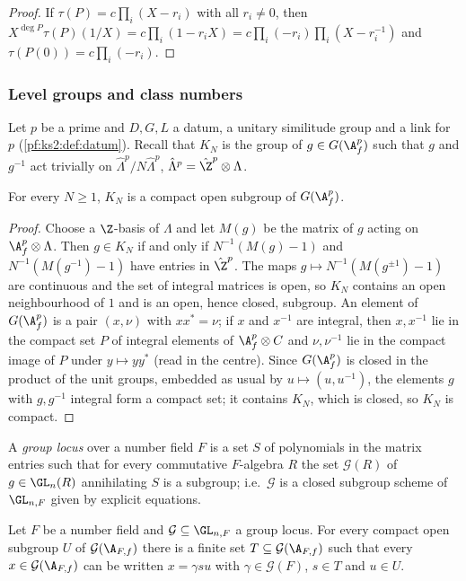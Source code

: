 \begin{proof}
If $\tau(P)=c\prod_i(X-r_i)$ with all $r_i\ne0$, then $X^{\deg P}\tau(P)(1/X)=c\prod_i(1-r_iX)=c\prod_i(-r_i)\prod_i(X-r_i^{-1})$
and $\tau(P(0))=c\prod_i(-r_i)$.
\end{proof}

\subsubsection{Level groups and class numbers}

Let $p$ be a prime and $D,G,L$ a datum, a unitary similitude group and a link for $p$
(\cref{pf:ks2:def:datum}). Recall that $K_N$ is the group of $g\in G(\A_f^p)$ such that $g$ and $g^{-1}$ act
trivially on $\hat\Lambda^p/N\hat\Lambda^p$, $\hat\Lambda^p=\hat\Z^p\otimes\Lambda$.

\begin{lemma}\label{pf:geo:kn}
For every $N\ge1$, $K_N$ is a compact open subgroup of $G(\A_f^p)$.
\end{lemma}

\begin{proof}
Choose a $\Z$-basis of $\Lambda$ and let $M(g)$ be the matrix of $g$ acting on $\A_f^p\otimes\Lambda$. Then $g\in K_N$ if and only
if $N^{-1}(M(g)-1)$ and $N^{-1}(M(g^{-1})-1)$ have entries in $\hat\Z^p$. The maps $g\mapsto N^{-1}(M(g^{\pm1})-1)$ are
continuous and the set of integral matrices is open, so $K_N$ contains an open neighbourhood of $1$ and is an
open, hence closed, subgroup. An element of $G(\A_f^p)$ is a pair $(x,\nu)$ with $xx^*=\nu$; if $x$ and $x^{-1}$ are
integral, then $x,x^{-1}$ lie in the compact set $P$ of integral elements of $\A_f^p\otimes C$ and $\nu,\nu^{-1}$ lie in the
compact image of $P$ under $y\mapsto yy^*$ (read in the centre). Since $G(\A_f^p)$ is closed in the product of the
unit groups, embedded as usual by $u\mapsto(u,u^{-1})$, the elements $g$ with $g,g^{-1}$ integral form a compact set;
it contains $K_N$, which is closed, so $K_N$ is compact.
\end{proof}

A \emph{group locus} over a number field $F$ is a set $S$ of polynomials in the matrix entries such that for every
commutative $F$-algebra $R$ the set $\mathcal G(R)$ of $g\in\GL_n(R)$ annihilating $S$ is a subgroup; i.e.\ $\mathcal G$ is a
closed subgroup scheme of $\GL_{n,F}$ given by explicit equations.

\begin{theorem}\label{pf:geo:classnumber}
Let $F$ be a number field and $\mathcal G\subseteq\GL_{n,F}$ a group locus. For every compact open subgroup $U$ of
$\mathcal G(\A_{F,f})$ there is a finite set $T\subseteq\mathcal G(\A_{F,f})$ such that every $x\in\mathcal G(\A_{F,f})$ can be written
$x=\gamma su$ with $\gamma\in\mathcal G(F)$, $s\in T$ and $u\in U$.
\end{theorem}

